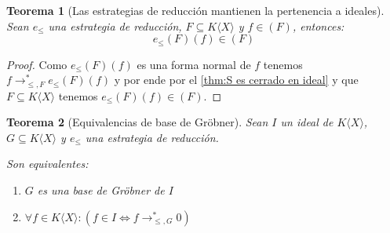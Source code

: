 \documentclass[fleqn]{amsbook} %
\theoremstyle{customstyle}
\newtheorem{theorem}{Teorema}[section]
\begin{document}
\begin{theorem}[Las estrategias de reducción mantienen la pertenencia a ideales]\label{thm:e mantiene pertenencia a ideal}
Sean $e_≤$ una estrategia de reducción, $F ⊆ K⟨X⟩$ y $f ∈ (F)$, entonces:
\[ e_≤(F)(f) ∈ (F) \]
\end{theorem}
\begin{proof}
Como $e_≤(F)(f)$ es una forma normal de $f$ tenemos $f →^*_{≤, F} e_≤(F)(f)$ y por ende por el \cref{thm:S es cerrado en ideal} y que $F ⊆ K⟨X⟩$ tenemos $e_≤(F)(f) ∈ (F)$.
\end{proof}

\begin{theorem}[Equivalencias de base de Gröbner]\label{thm:equivalencias de base de Gröbner}
Sean $I$ un ideal de $K⟨X⟩$, $G ⊆ K⟨X⟩$ y $e_≤$ una estrategia de reducción.

Son equivalentes:
\begin{enumerate}
\item $G$ es una base de Gröbner de $I$

\item $∀f ∈ K⟨X⟩ : (f ∈ I ⇔ f →^*_{≤, G} 0)$

\end{enumerate}

\end{theorem}
\end{document}
